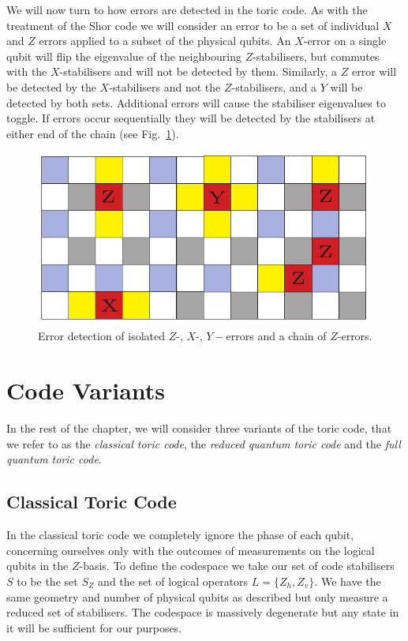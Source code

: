 We will now turn to how errors are detected in the toric code. As with the treatment of the Shor code we will consider an error to be a set of individual $X$ and $Z$ errors applied to a subset of the physical qubits. An $X$-error on a single qubit will flip the eigenvalue of the neighbouring $Z$-stabilisers, but commutes with the $X$-stabilisers and will not be detected by them. Similarly, a $Z$ error will be detected by the $X$-stabilisers and not the $Z$-stabilisers, and a $Y$ will be detected by both sets. Additional errors will cause the stabiliser eigenvalues to toggle. If errors occur sequentially they will be detected by the stabilisers at either end of the chain (see Fig.~\ref{basic_errors}).


\begin{figure}[htb]
  \begin{center}
    \includegraphics{assets/basic_errors.pdf}
  \end{center}
  \caption{Error detection of isolated $Z$-, $X$-, $Y-$errors and a chain of $Z$-errors.}
  \label{basic_errors}
\end{figure}

\section{Code Variants}

In the rest of the chapter, we will consider three variants of the toric code, that we refer to as the \textit{classical toric code}, the \textit{reduced quantum toric code} and the \textit{full quantum toric code}.

\subsection{Classical Toric Code}

In the classical toric code we completely ignore the phase of each qubit, concerning ourselves only with the outcomes of measurements on the logical qubits in the $Z$-basis. To define the codespace we take our set of code stabilisers $S$ to be the set $S_Z$ and the set of logical operators $L=\{Z_h, Z_v\}$. We have the same geometry and number of physical qubits as described but only measure a reduced set of stabilisers. The codespace is massively degenerate but any state in it will be sufficient for our purposes.


